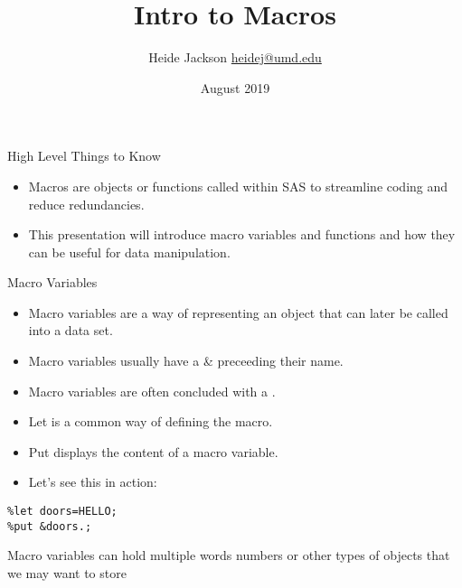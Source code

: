 \documentclass{beamer}
\title{Intro to Macros}
\author{\texorpdfstring{Heide Jackson \newline\url{heidej@umd.edu}}{Author}}
\institute{University of Maryland Population Research Center}
\date{August 2019}
\begin{document}
\maketitle
\begin{frame}{High Level Things to Know}
\begin{itemize}
\item Macros are objects or functions called within SAS to streamline coding and reduce redundancies.
\item This presentation will introduce macro variables and functions and how they can be useful for data manipulation.
\end{itemize}
\end{frame}


\begin{frame}[fragile]{Macro Variables}

\begin{itemize}
\item Macro variables are a way of representing an object that can later be called into a data set.
\item Macro variables usually have a \& preceeding their name.
\item Macro variables are often concluded with a .
\item Let is a common way of defining the macro.
\item Put displays the content of a macro variable.
\item Let's see this in action:
\end{itemize}
\begin{verbatim}
%let doors=HELLO;
%put &doors.;
\end{verbatim}
\item Macro variables can hold multiple words numbers or other types of objects that we may want to store
\end{frame}
\end{document}

